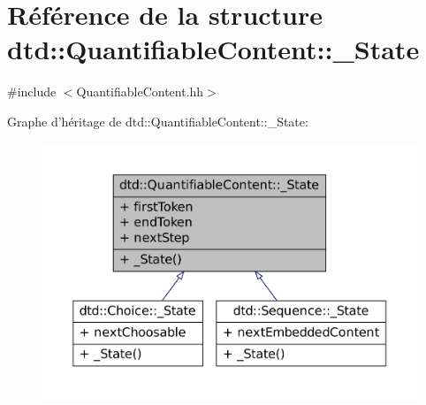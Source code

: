 \hypertarget{structdtd_1_1_quantifiable_content_1_1___state}{
\section{Référence de la structure dtd::QuantifiableContent::\_\-State}
\label{structdtd_1_1_quantifiable_content_1_1___state}
}


{\ttfamily \#include $<$QuantifiableContent.hh$>$}



Graphe d'héritage de dtd::QuantifiableContent::\_\-State:\nopagebreak
\begin{figure}[H]
\begin{center}
\leavevmode
\includegraphics[width=400pt]{structdtd_1_1_quantifiable_content_1_1___state__inherit__graph}
\end{center}
\end{figure}



